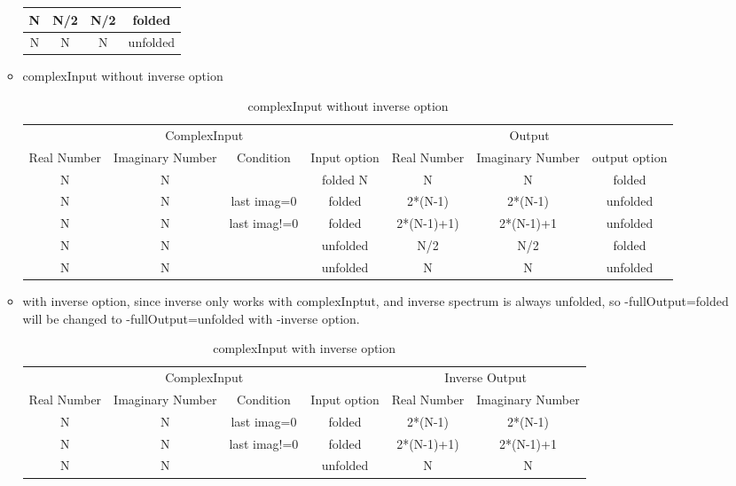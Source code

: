 \begin{itemize}
\begin{itemize}
\begin{table}[hbt]
\begin{tabular}{|c|c|c|c|}
        N & N/2 & N/2  &folded \\ \hline
        N & N   & N  &unfolded \\ \hline
        \end{tabular}
        \label{table1}
        \end{table}
    \item complexInput without inverse option
        \begin{table}[hbt]
        \caption{complexInput without inverse option}
        \begin{tabular}{|c|c|c|c|c|c|c|}  
        \multicolumn{4}{|c|}{ComplexInput}  &\multicolumn{3}{|c|}{Output} \\ 
        Real Number & Imaginary Number & Condition & Input option & Real Number & Imaginary Number & output option \\ \hline
        N & N & & folded N & N & N & folded \\ \hline
        N & N & last imag=0 & folded & 2*(N-1) & 2*(N-1) &unfolded \\ \hline
        N & N & last imag!=0 & folded & 2*(N-1)+1) & 2*(N-1)+1 & unfolded \\ \hline
        N & N & & unfolded & N/2 & N/2 & folded \\ \hline
        N & N & & unfolded & N & N & unfolded \\ \hline
        \end{tabular}
        \label{table2}
        \end{table}
     \item with inverse option, since inverse only works with complexInptut, and inverse spectrum is always unfolded, so -fullOutput=folded will be changed to -fullOutput=unfolded with -inverse option.
        \begin{table}[hbt]
        \caption{complexInput with inverse option}
        \begin{tabular}{|c|c|c|c|c|c|} 
        \multicolumn{4}{|c|}{ComplexInput}  &\multicolumn{2}{|c|}{Inverse Output} \\
        Real Number & Imaginary Number & Condition & Input option & Real Number & Imaginary Number  \\ \hline
        N & N & last imag=0 & folded & 2*(N-1) & 2*(N-1) \\ \hline
        N & N & last imag!=0 & folded & 2*(N-1)+1) & 2*(N-1)+1\\ \hline
        N & N & & unfolded & N & N\\ \hline
        \end{tabular}

\end{table}
\end{itemize}
\end{itemize}
